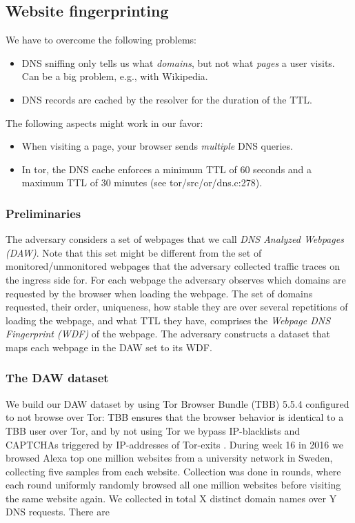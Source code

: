 \subsection{Website fingerprinting}
We have to overcome the following problems:
\begin{itemize}
	\item DNS sniffing only tells us what \emph{domains}, but not what
		\emph{pages} a user visits.  Can be a big problem, e.g., with Wikipedia.
	\item DNS records are cached by the resolver for the duration of the TTL.
\end{itemize}

The following aspects might work in our favor:
\begin{itemize}
	\item When visiting a page, your browser sends \emph{multiple} DNS queries.
	\item In tor, the DNS cache enforces a minimum TTL of 60 seconds and a maximum
	TTL of 30 minutes (see tor/src/or/dns.c:278).
\end{itemize}


\subsubsection{Preliminaries}
The adversary considers a set of webpages that we call \emph{DNS
Analyzed Webpages (DAW)}. Note that this set might be different from the
set of monitored/unmonitored webpages that the adversary collected
traffic traces on the ingress side for.
For each webpage the adversary observes which domains are requested by
the browser when loading the webpage. The set of domains requested,
their order, uniqueness, how stable they are over several repetitions of
loading the webpage, and what TTL they have, comprises the
\emph{Webpage DNS Fingerprint (WDF)} of the webpage.
The adversary constructs a dataset that maps each webpage in the DAW set
to its WDF.

\subsubsection{The DAW dataset}
We build our DAW dataset by using Tor Browser Bundle (TBB) 5.5.4
configured to not browse over Tor: TBB ensures that the browser behavior is
identical to a TBB user over Tor, and by not using Tor we bypass IP-blacklists
and CAPTCHAs triggered by IP-addresses of Tor-exits \cite{Khattak2016a}.
During week 16 in 2016 we browsed Alexa top one million websites from a
university network in Sweden, collecting five samples from each website.
Collection was done in rounds, where each round uniformly randomly browsed all one
million websites before visiting the same website again. We collected in total
X distinct domain names over Y DNS requests. There are

